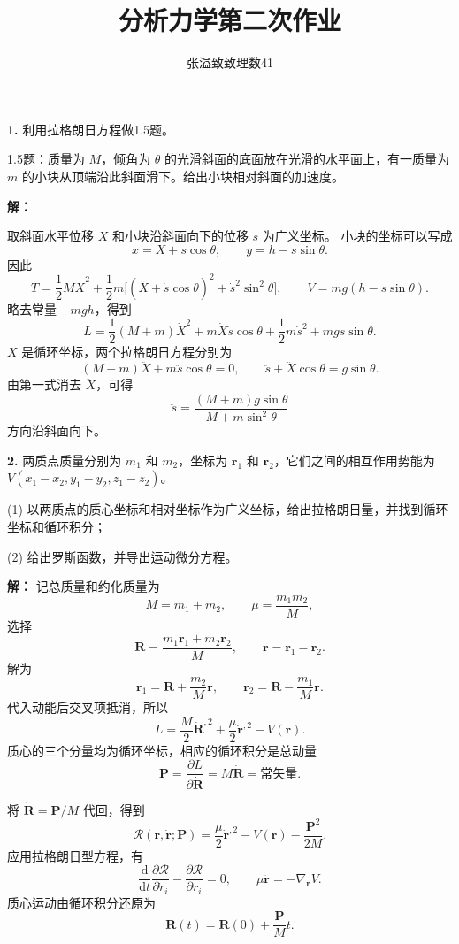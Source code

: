 \documentclass[11pt,a4paper]{ctexart}
\title{分析力学第二次作业}
\author{张溢致\quad 致理数41\quad 2024011936}
\date{}
\begin{document}
\maketitle
\noindent\textbf{1.} 利用拉格朗日方程做1.5题。

\smallskip
\noindent 1.5题：质量为 $M$，倾角为 $\theta$ 的光滑斜面的底面放在光滑的水平面上，有一质量为 $m$ 的小块从顶端沿此斜面滑下。给出小块相对斜面的加速度。
\begin{center}
\end{center}
\noindent\textbf{解：}

取斜面水平位移 $X$ 和小块沿斜面向下的位移 $s$ 为广义坐标。
小块的坐标可以写成
\[
x=X+s\cos\theta,\qquad y=h-s\sin\theta.
\]
因此
\[
T=\frac12M\dot X^2+\frac12m\bigl[(\dot X+\dot s\cos\theta)^2+\dot s^2\sin^2\theta\bigr],
\qquad V=mg(h-s\sin\theta).
\]
略去常量 $-mgh$，得到
\[
L=\frac12(M+m)\dot X^2+m\dot X\dot s\cos\theta+\frac12m\dot s^2+mgs\sin\theta.
\]
$X$ 是循环坐标，两个拉格朗日方程分别为
\[
(M+m)\ddot X+m\ddot s\cos\theta=0,
\qquad \ddot s+\ddot X\cos\theta=g\sin\theta.
\]
由第一式消去 $\ddot X$，可得
\[
\ddot s=\frac{(M+m)g\sin\theta}{M+m\sin^2\theta}
\]
方向沿斜面向下。


\noindent\textbf{2.} 两质点质量分别为 $m_1$ 和 $m_2$，坐标为 $\bm r_1$ 和 $\bm r_2$，它们之间的相互作用势能为 $V(x_1-x_2,y_1-y_2,z_1-z_2)$。

(1) 以两质点的质心坐标和相对坐标作为广义坐标，给出拉格朗日量，并找到循环坐标和循环积分；

(2) 给出罗斯函数，并导出运动微分方程。

\noindent\textbf{解：}
记总质量和约化质量为
\[
M=m_1+m_2,\qquad \mu=\frac{m_1m_2}{M},
\]
选择
\[
\bm R=\frac{m_1\bm r_1+m_2\bm r_2}{M},\qquad \bm r=\bm r_1-\bm r_2.
\]
解为
\[
\bm r_1=\bm R+\frac{m_2}{M}\bm r,\qquad
\bm r_2=\bm R-\frac{m_1}{M}\bm r.
\]
代入动能后交叉项抵消，所以
\[
{L=\frac M2\dot{\bm R}^{,2}+\frac\mu2\dot{\bm r}^{,2}-V(\bm r)}.
\]
质心的三个分量均为循环坐标，相应的循环积分是总动量
\[
{\bm P=\frac{\partial L}{\partial\dot{\bm R}}=M\dot{\bm R}=\text{常矢量}}.
\]


将 $\dot{\bm R}=\bm P/M$ 代回，得到
\[
{\mathcal R(\bm r,\dot{\bm r};\bm P)=\frac\mu2\dot{\bm r}^{,2}-V(\bm r)-\frac{\bm P^2}{2M}}.
\]
应用拉格朗日型方程，有
\[
\frac{\mathrm d}{\mathrm dt}\frac{\partial\mathcal R}{\partial\dot r_i}-\frac{\partial\mathcal R}{\partial r_i}=0,
\qquad{\mu\ddot{\bm r}=-\nabla_{\bm r}V}.
\]
质心运动由循环积分还原为
\[
{\bm R(t)=\bm R(0)+\frac{\bm P}{M}t}.
\]
\end{document}
